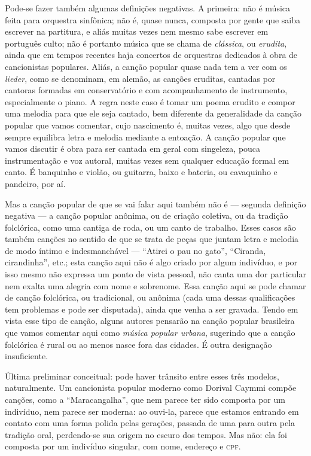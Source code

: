Pode-se fazer também algumas definições negativas. A primeira: 
não é música feita para orquestra sinfônica; não é, quase
nunca, composta por gente que saiba escrever na partitura, e aliás
muitas vezes nem mesmo sabe escrever em português culto; não é portanto
música que se chama de \textit{clássica}, ou \textit{erudita}, ainda que em tempos
recentes haja concertos de orquestras dedicados à obra de cancionistas
populares. Aliás, a canção popular quase nada tem a ver com os
\textit{lieder}, como se denominam, em alemão, as canções eruditas, cantadas
por cantoras formadas em conservatório e com acompanhamento de
instrumento, especialmente o piano. A regra neste caso é tomar
um poema erudito e compor uma melodia para que ele seja cantado, bem
diferente da generalidade da canção popular que vamos comentar, cujo
nascimento é, muitas vezes, algo que desde sempre equilibra letra e
melodia mediante a entoação. A canção popular que vamos discutir é obra
para ser cantada em geral com singeleza, pouca instrumentação e voz
autoral, muitas vezes sem qualquer educação formal em canto. É banquinho
e violão, ou guitarra, baixo e bateria, ou cavaquinho e pandeiro, por
aí.

Mas a canção popular de que se vai falar aqui também não é --- segunda
definição negativa --- a canção popular anônima, ou de criação coletiva,
ou da tradição folclórica, como uma cantiga de roda, ou um canto de
trabalho. Esses casos são também canções no sentido de que se trata de
peças que juntam letra e melodia de modo íntimo e indesmanchável ---
``Atirei o pau no gato'', ``Ciranda, cirandinha'', etc.; esta canção aqui não é
algo criado por algum indivíduo, e por isso mesmo não expressa um ponto
de vista pessoal, não canta uma dor particular nem exalta uma alegria
com nome e sobrenome. Essa canção aqui se pode chamar de canção
folclórica, ou tradicional, ou anônima (cada uma dessas qualificações
tem problemas e pode ser disputada), ainda que venha a ser gravada.
Tendo em vista esse tipo de canção, alguns autores pensarão na canção
popular brasileira que vamos comentar aqui como \textit{música popular
urbana}, sugerindo que a canção folclórica é rural ou ao menos nasce
fora das cidades. É outra designação insuficiente.

Última preliminar conceitual: pode haver trânsito entre esses três
modelos, naturalmente. Um cancionista popular moderno como Dorival
Caymmi compõe canções, como a ``Maracangalha'', que nem parece ter sido
composta por um indivíduo, nem parece ser moderna: ao ouvi-la, parece
que estamos entrando em contato com uma forma polida pelas gerações,
passada de uma para outra pela tradição oral, perdendo-se sua origem no
escuro dos tempos. Mas não: ela foi composta por um indivíduo singular,
com nome, endereço e \textsc{cpf}.

